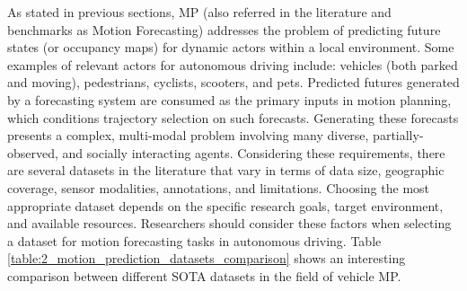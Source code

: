 As stated in previous sections, \ac{MP} (also referred in the literature and benchmarks as Motion Forecasting) addresses the problem of predicting future states (or occupancy maps) for dynamic actors within a local environment. Some examples of relevant actors for autonomous driving include: vehicles (both parked and moving), pedestrians, cyclists, scooters, and pets. Predicted futures generated by a forecasting system are consumed as the primary inputs in motion planning, which conditions trajectory selection on such forecasts. Generating these forecasts presents a complex, multi-modal problem involving many diverse, partially-observed, and socially interacting agents. Considering these requirements, there are several datasets in the literature that vary in terms of data size, geographic coverage, sensor modalities, annotations, and limitations. Choosing the most appropriate dataset depends on the specific research goals, target environment, and available resources. Researchers should consider these factors when selecting a dataset for motion forecasting tasks in autonomous driving. Table \ref{table:2_motion_prediction_datasets_comparison} \cite{wilson2023argoverse} shows an interesting comparison between different \ac{SOTA} datasets in the field of vehicle \ac{MP}.

